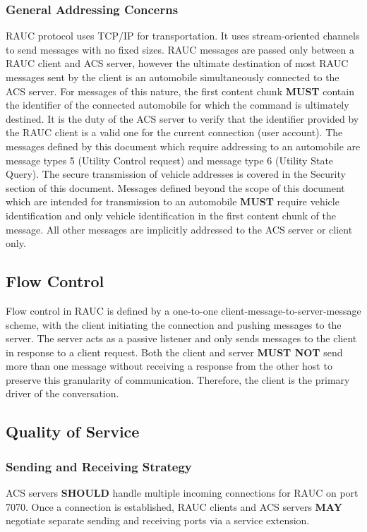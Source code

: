 \subsubsection{General Addressing Concerns}
\textsf{RAUC} protocol uses TCP/IP for transportation. It uses stream-oriented channels to send messages with no fixed sizes. RAUC messages are passed only between a RAUC client and ACS server, however the ultimate destination of most RAUC messages sent by the client is an automobile simultaneously connected to the ACS server. For messages of this nature, the  first content chunk \textbf{MUST} contain the identifier of the connected automobile for which the command is ultimately destined. It is the duty of the ACS server to verify that the identifier provided by the RAUC client is a valid one for the current connection (user account).  The messages defined by this document which require addressing to an automobile are message types 5 (Utility Control request) and message type 6 (Utility State Query). The secure transmission of vehicle addresses is covered in the Security section of this document. Messages defined beyond the scope of this document which are intended for transmission to an automobile \textbf{MUST} require vehicle identification and only vehicle identification in the first content chunk of the message. All other messages are implicitly addressed to the ACS server or client only.  



\label{sec:ct}

\subsection{Flow Control}
\label{sec:pdus:flow}
Flow control in RAUC is defined by a one-to-one client-message-to-server-message scheme, with the client initiating the connection and pushing messages to the server. The server acts as a passive listener and only sends messages to the client in response to a client request. Both the client and server \textbf{MUST NOT} send more than one message without receiving a response from the other host to preserve this granularity of communication. Therefore, the client is the primary driver of the conversation.

\subsection{Quality of Service}
\subsubsection{Sending and Receiving Strategy}
ACS servers \textbf{SHOULD} handle multiple incoming connections for RAUC on port 7070. Once a connection is established, RAUC clients and ACS servers \textbf{MAY} negotiate separate sending and receiving ports via a service extension.

